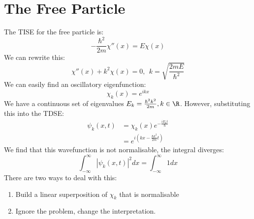 \documentclass[../Main.tex]{subfiles}
\begin{document}
\section{The Free Particle}
The TISE for the free particle is:
\begin{equation*}
    -\frac{\hbar^2}{2m}\chi''(x) = E\chi(x)
\end{equation*}
We can rewrite this:
\begin{equation}
    \chi''(x) + k^2 \chi(x) = 0,~~k = \sqrt{\frac{2mE}{\hbar^2}}
    \label{eqnFPTISE}
\end{equation}
We can easily find an oscillatory eigenfunction:
\begin{equation*}
    \chi_k(x) = e^{ikx}
\end{equation*}
We have a continuous set of eigenvalues $E_k = \frac{\hbar^2 k^2}{2m}, k \in \R$.
However, substituting this into the TDSE:
\begin{align*}
    \psi_k(x, t) &= \chi_k(x) e^{-\frac{iE_kt}{\hbar}} \\
    &= e^{i\left(kx - \frac{\hbar k^2}{2m}t\right)}
\end{align*}
We find that this wavefunction is not normalisable, the integral diverges:
\begin{equation*}
    \int_{-\infty}^{\infty} |\psi_k(x, t)|^2 dx = \int_{-\infty}^{\infty} 1 dx
\end{equation*}
There are two ways to deal with this:
\begin{enumerate}
    \item Build a linear superposition of $\chi_k$ that is normalisable
    \item Ignore the problem, change the interpretation.
\end{enumerate}
\end{document}
